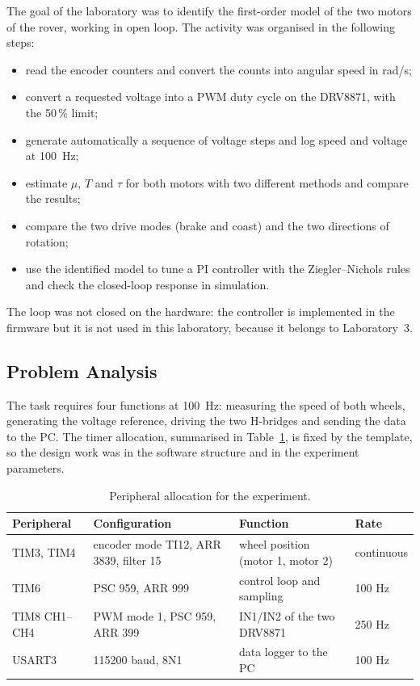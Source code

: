 \documentclass[english]{article}
\begin{document}
\noindent The goal of the laboratory was to identify the first-order model of the two motors of the rover, working in
open loop. The activity was organised in the following steps:

\begin{itemize}[nosep]
  \item read the encoder counters and convert the counts into angular speed in rad/s;
  \item convert a requested voltage into a PWM duty cycle on the DRV8871, with the 50\,\% limit;
  \item generate automatically a sequence of voltage steps and log speed and voltage at 100~Hz;
  \item estimate $\mu$, $T$ and $\tau$ for both motors with two different methods and compare the results;
  \item compare the two drive modes (brake and coast) and the two directions of rotation;
  \item use the identified model to tune a PI controller with the Ziegler--Nichols rules and check the closed-loop
        response in simulation.
\end{itemize}

\noindent The loop was not closed on the hardware: the controller is implemented in the firmware but it is not used
in this laboratory, because it belongs to Laboratory~3.

\subsection{Problem Analysis}

The task requires four functions at 100~Hz: measuring the speed of both wheels, generating the voltage reference,
driving the two H-bridges and sending the data to the PC. The timer allocation, summarised in
Table~\ref{tab:lab2-peripherals}, is fixed by the template, so the design work was in the software structure and in
the experiment parameters.

\begin{table}[H]
  \centering
  \small
  \begin{tabular}{@{}llll@{}}
    \toprule
    Peripheral    & Configuration                          & Function                          & Rate       \\
    \midrule
    TIM3, TIM4    & encoder mode TI12, ARR 3839, filter 15 & wheel position (motor 1, motor 2) & continuous \\
    TIM6          & PSC 959, ARR 999                       & control loop and sampling         & 100 Hz     \\
    TIM8 CH1--CH4 & PWM mode 1, PSC 959, ARR 399           & IN1/IN2 of the two DRV8871        & 250 Hz     \\
    USART3        & 115200 baud, 8N1                       & data logger to the PC             & 100 Hz     \\
    \bottomrule
  \end{tabular}
  \caption{Peripheral allocation for the experiment.}
  \label{tab:lab2-peripherals}
\end{table}
\end{document}
